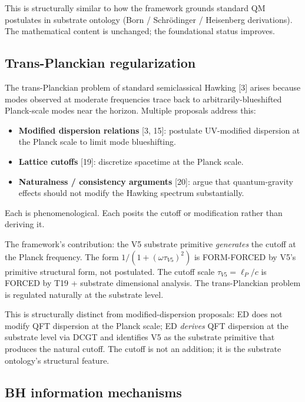 \documentclass[11pt,a4paper]{article}
\begin{document}
This is structurally similar to how the framework grounds standard QM postulates in substrate ontology (Born / Schr\"odinger / Heisenberg derivations). The mathematical content is unchanged; the foundational status improves.

\subsection{Trans-Planckian regularization}

The trans-Planckian problem of standard semiclassical Hawking [3] arises because modes observed at moderate frequencies trace back to arbitrarily-blueshifted Planck-scale modes near the horizon. Multiple proposals address this:

\begin{itemize}[noitemsep]
\item \textbf{Modified dispersion relations} [3, 15]: postulate UV-modified dispersion at the Planck scale to limit mode blueshifting.
\item \textbf{Lattice cutoffs} [19]: discretize spacetime at the Planck scale.
\item \textbf{Naturalness / consistency arguments} [20]: argue that quantum-gravity effects should not modify the Hawking spectrum substantially.
\end{itemize}

Each is phenomenological. Each posits the cutoff or modification rather than deriving it.

The framework's contribution: the V5 substrate primitive \emph{generates} the cutoff at the Planck frequency. The form $1/(1+(\omega\tau_{V5})^{2})$ is FORM-FORCED by V5's primitive structural form, not postulated. The cutoff scale $\tau_{V5} = \ell_P/c$ is FORCED by T19 + substrate dimensional analysis. The trans-Planckian problem is regulated naturally at the substrate level.

This is structurally distinct from modified-dispersion proposals: ED does not modify QFT dispersion at the Planck scale; ED \emph{derives} QFT dispersion at the substrate level via DCGT and identifies V5 as the substrate primitive that produces the natural cutoff. The cutoff is not an addition; it is the substrate ontology's structural feature.

\subsection{BH information mechanisms}
\end{document}
